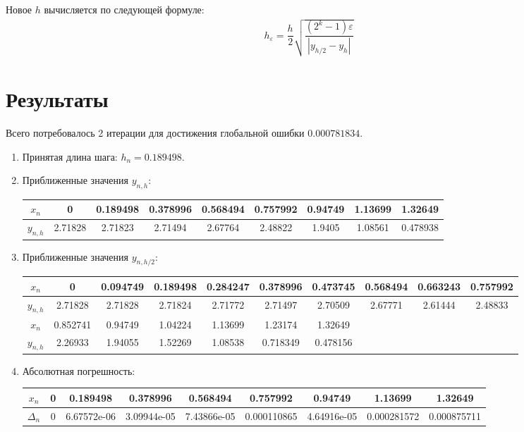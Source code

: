 \documentclass[10pt,a4paper,oneside,russian]{article}
\begin{document}
Новое $h$ вычисляется по следующей формуле:
\begin{align*}
  h_{\varepsilon} = \dfrac{h}{2}\sqrt{\dfrac{(2^k - 1)\varepsilon}{\left|y_{h/2} - y_h\right|}}
\end{align*}

\section{Результаты}
Всего потребовалось 2 итерации для достижения глобальной ошибки $0.000781834$.
\begin{enumerate}
  \item Принятая длина шага: $h_n = 0.189498$.
  \item Приближенные значения $y_{n,h}$:

  \begin{tabular}{|c|c|c|c|c|c|c|c|c|}
    \hline
    $x_n$ & 0 & 0.189498 & 0.378996 & 0.568494 & 0.757992 & 0.94749 & 1.13699 & 1.32649 \\\hline
    $y_{n,h}$ & 2.71828 & 2.71823 & 2.71494 & 2.67764 & 2.48822 & 1.9405 & 1.08561 & 0.478938 \\\hline
  \end{tabular}

  \item Приближенные значения $y_{n,h/2}$:

  \begin{tabular}{|c|c|c|c|c|c|c|c|c|c|}
    \hline
    $x_n$ & 0 & 0.094749 & 0.189498 & 0.284247 & 0.378996 & 0.473745 & 0.568494 & 0.663243 & 0.757992 \\\hline
    $y_{n,h}$ & 2.71828 & 2.71828 & 2.71824 & 2.71772 & 2.71497 & 2.70509 & 2.67771 & 2.61444 & 2.48833 \\\hline
    $x_n$ & 0.852741 & 0.94749 & 1.04224 & 1.13699 & 1.23174 & 1.32649 \\\hline
    $y_{n,h}$ & 2.26933 & 1.94055 & 1.52269 & 1.08538 & 0.718349 & 0.478156\\\hline
  \end{tabular}

  \item Абсолютная погрешность:

  \begin{tabular}{|c|c|c|c|c|c|c|c|c|}
    \hline
    $x_n$ & 0 & 0.189498 & 0.378996 & 0.568494 & 0.757992 & 0.94749 & 1.13699 & 1.32649\\\hline
    $\Delta_n$ & 0 & 6.67572e-06 & 3.09944e-05 & 7.43866e-05 & 0.000110865 & 4.64916e-05 & 0.000281572 & 0.000875711 \\\hline
  \end{tabular}


\end{enumerate}
\end{document}
